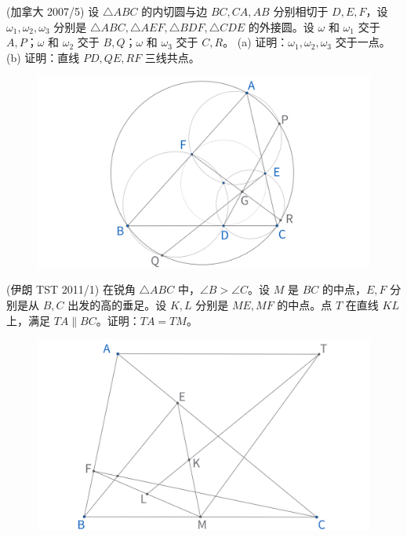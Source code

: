 \newpage 
\begin{exercise}
(加拿大 2007/5) 设 $\triangle ABC$ 的内切圆与边 $BC, CA, AB$ 分别相切于 $D, E, F$，设 $\omega_1, \omega_2, \omega_3$ 分别是 $\triangle ABC, \triangle AEF, \triangle BDF, \triangle CDE$ 的外接圆。设 $\omega$ 和 $\omega_1$ 交于 $A, P$；$\omega$ 和 $\omega_2$ 交于 $B, Q$；$\omega$ 和 $\omega_3$ 交于 $C, R$。
(a) 证明：$\omega_1, \omega_2, \omega_3$ 交于一点。
(b) 证明：直线 $PD, QE, RF$ 三线共点。
\end{exercise}
\begin{figure}[H]
    \centering
    \includegraphics[width=0.7\linewidth]{figures/exercises/237.png}
\end{figure}

\begin{exercise}
(伊朗 TST 2011/1) 在锐角 $\triangle ABC$ 中，$\angle B > \angle C$。设 $M$ 是 ${BC}$ 的中点，$E, F$ 分别是从 $B, C$ 出发的高的垂足。设 $K, L$ 分别是 $ME, MF$ 的中点。点 $T$ 在直线 $KL$ 上，满足 $TA \parallel BC$。证明：$TA = TM$。
\end{exercise}
\begin{figure}[H]
    \centering
    \includegraphics[width=0.7\linewidth]{figures/exercises/238.png}
\end{figure}
